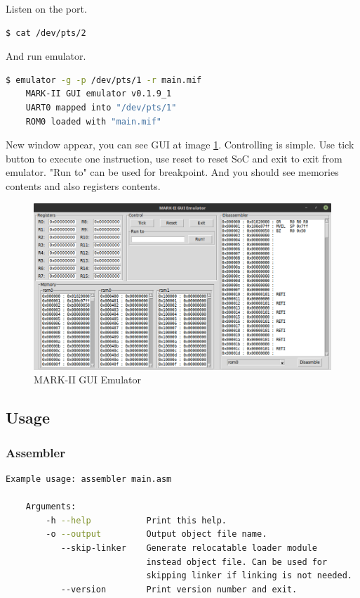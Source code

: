 Listen on the port.

\begin{lstlisting}[language=bash, frame=single]
    $ cat /dev/pts/2
\end{lstlisting}

And run emulator.

\begin{lstlisting}[language=bash, frame=single]
    $ emulator -g -p /dev/pts/1 -r main.mif
    MARK-II GUI emulator v0.1.9_1
    UART0 mapped into "/dev/pts/1"
    ROM0 loaded with "main.mif"
\end{lstlisting}

New window appear, you can see GUI at image \ref{fig:gui_emulator}. Controlling
is simple. Use tick button to execute one instruction, use reset to reset SoC
and exit to exit from emulator. "Run to" can be used for breakpoint. And you
should see memories contents and also registers contents.

\begin{figure}[h]
    \centering
    \includegraphics[width=\textwidth]{img/emulator.png}
    \caption{MARK-II GUI Emulator}
    \label{fig:gui_emulator}
\end{figure}

\subsection{Usage}

\subsubsection{Assembler}

\begin{lstlisting}[language=bash, frame=single]
    Example usage: assembler main.asm

    Arguments:
        -h --help           Print this help.
        -o --output         Output object file name.
           --skip-linker    Generate relocatable loader module
                            instead object file. Can be used for
                            skipping linker if linking is not needed.
           --version        Print version number and exit.
\end{lstlisting}

